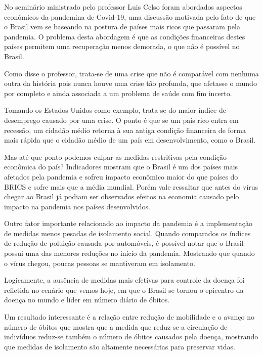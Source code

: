 \documentclass[
	12pt,				%
	openright,			%
	twoside,			%
	a4paper,			%
	english,			%
	brazil,				%
	svgnames
	]{abntex2}\usepackage[]{graphicx}\usepackage[]{color}
\begin{document}
No seminário ministrado pelo professor Luis Celso foram abordados aspectos econômicos da pandemina de Covid-19, uma discussão motivada pelo fato de que o Brasil vem se baseando na postura de países mais ricos que passaram pela pandemia. O problema desta abordagem é que as condições financeiras destes países permitem uma recuperação menos demorada, o que não é possível no Brasil. 

Como disse o professor, trata-se de uma crise que não é comparável com nenhuma outra da história pois nunca houve uma crise tão profunda, que afetasse o mundo por completo e ainda associada a um problema de saúde com fim incerto. 

Tomando os Estados Unidos como exemplo, trata-se do maior índice de desemprego causado por uma crise. O ponto é que se um país rico entra em recessão, um cidadão médio retorna à sua antiga condição financeira de forma mais rápida que o cidadão médio de um país em desenvolvimento, como o Brasil.

Mas até que ponto podemos culpar as medidas restritivas pela condição econômica do país? Indicadores mostram que o Brasil é um dos países mais afetados pela pandemia e sofreu impacto econômico maior do que países do BRICS e sofre mais que a média mundial. Porém vale ressaltar que antes do vírus chegar ao Brasil já podiam ser observados efeitos na economia causado pelo impacto na pandemia nos países desenvolvidos. 

Outro fator importante relacionado ao impacto da pandemia é a implementação de medidas menos pesadas de isolamento social. Quando comparados os índices de redução de poluição causada por automóveis, é possível notar que o Brasil possui uma das menores reduções no início da pandemia. Mostrando que quando o vírus chegou, poucas pessoas se mantiveram em isolamento.

Logicamente, a ausência de medidas mais efetivas para controle da doença foi refletida no cenário que vemos hoje, em que o Brasil se tornou o epicentro da doença no mundo e líder em número diário de óbitos.

Um resultado interessante é a relação entre redução de mobilidade e o avanço no número de óbitos que mostra que a medida que reduz-se a circulação de indivíduos reduz-se também o número de óbitos causados pela doença, mostrando que medidas de isolamento são altamente necessárias para preservar vidas.
\end{document}
